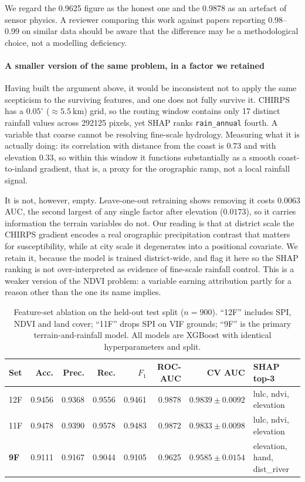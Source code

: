 \documentclass[journal]{IEEEtran}
\begin{document}
We regard the 0.9625 figure as the honest one and the 0.9878 as an artefact of
sensor physics. A reviewer comparing this work against papers reporting
0.98--0.99 on similar data should be aware that the difference may be a
methodological choice, not a modelling deficiency.

\paragraph{A smaller version of the same problem, in a factor we retained}
Having built the argument above, it would be inconsistent not to apply the same
scepticism to the surviving features, and one does not fully survive it. CHIRPS
has a $0.05^\circ$ ($\approx\SI{5.5}{\kilo\metre}$) grid, so the routing window
contains only 17 distinct rainfall values across \num{292125} pixels, yet SHAP
ranks \texttt{rain\_annual} fourth. A variable that coarse cannot be resolving
fine-scale hydrology. Measuring what it is actually doing: its correlation with
distance from the coast is $0.73$ and with elevation $0.33$, so within this
window it functions substantially as a smooth coast-to-inland gradient, that is,
a proxy for the orographic ramp, not a local rainfall signal.

It is not, however, empty. Leave-one-out retraining shows removing it costs
$0.0063$ AUC, the second largest of any single factor after elevation
($0.0173$), so it carries information the terrain variables do not. Our reading
is that at district scale the CHIRPS gradient encodes a real orographic
precipitation contrast that matters for susceptibility, while at city scale it
degenerates into a positional covariate. We retain it, because the model is
trained district-wide, and flag it here so the SHAP ranking is not
over-interpreted as evidence of fine-scale rainfall control. This is a weaker
version of the NDVI problem: a variable earning attribution partly for a reason
other than the one its name implies.

\begin{table}[!t]
\centering\footnotesize
\caption{Feature-set ablation on the held-out test split ($n=900$). ``12F''
includes SPI, NDVI and land cover; ``11F'' drops SPI on VIF grounds; ``9F'' is
the primary terrain-and-rainfall model. All models are XGBoost with identical
hyperparameters and split.}
\label{tab:ablation}
\small
\begin{tabular}{@{}lrrrrrrl@{}}
\toprule
\textbf{Set} & \textbf{Acc.} & \textbf{Prec.} & \textbf{Rec.} & \textbf{$F_1$} &
\textbf{ROC-AUC} & \textbf{CV AUC} & \textbf{SHAP top-3} \\
\midrule
12F & 0.9456 & 0.9368 & 0.9556 & 0.9461 & 0.9878 & $0.9839\pm0.0092$ & lulc, ndvi, elevation \\
11F & 0.9478 & 0.9390 & 0.9578 & 0.9483 & 0.9872 & $0.9833\pm0.0098$ & lulc, ndvi, elevation \\
\textbf{9F} & 0.9111 & 0.9167 & 0.9044 & 0.9105 & 0.9625 & $0.9585\pm0.0154$ & elevation, hand, dist\_river \\
\bottomrule
\end{tabular}
\end{table}
\end{document}
